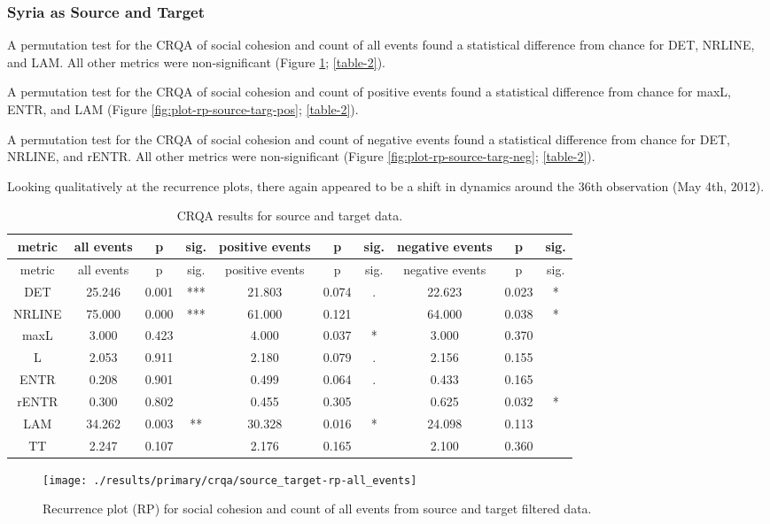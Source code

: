 \documentclass[
  english,
  man]{apa6}
\begin{document}
\hypertarget{syria-as-source-and-target}{%
\subsubsection{Syria as Source and Target}\label{syria-as-source-and-target}}

A permutation test for the CRQA of social cohesion and count of all events found
a statistical difference from chance for DET, NRLINE, and LAM. All other metrics
were non-significant (Figure \ref{fig:plot-rp-source-targ-all};
\autoref{table-2}).

A permutation test for the CRQA of social cohesion and count of positive events
found a statistical difference from chance for maxL, ENTR, and LAM (Figure
\ref{fig:plot-rp-source-targ-pos}; \autoref{table-2}).

A permutation test for the CRQA of social cohesion and count of negative events
found a statistical difference from chance for DET, NRLINE, and rENTR. All other
metrics were non-significant (Figure \ref{fig:plot-rp-source-targ-neg};
\autoref{table-2}).

Looking qualitatively at the recurrence plots, there again appeared to be a
shift in dynamics around the 36th observation (May 4th, 2012).

\begin{longtable}[]{@{}cccccccccc@{}}
\caption{\label{table-2}CRQA results for source and target data.}\tabularnewline
\toprule
metric & all events & p & sig. & positive events & p & sig. & negative events & p & sig.\tabularnewline
\midrule
\endfirsthead
\toprule
metric & all events & p & sig. & positive events & p & sig. & negative events & p & sig.\tabularnewline
\midrule
\endhead
DET & 25.246 & 0.001 & *** & 21.803 & 0.074 & . & 22.623 & 0.023 & *\tabularnewline
NRLINE & 75.000 & 0.000 & *** & 61.000 & 0.121 & & 64.000 & 0.038 & *\tabularnewline
maxL & 3.000 & 0.423 & & 4.000 & 0.037 & * & 3.000 & 0.370 &\tabularnewline
L & 2.053 & 0.911 & & 2.180 & 0.079 & . & 2.156 & 0.155 &\tabularnewline
ENTR & 0.208 & 0.901 & & 0.499 & 0.064 & . & 0.433 & 0.165 &\tabularnewline
rENTR & 0.300 & 0.802 & & 0.455 & 0.305 & & 0.625 & 0.032 & *\tabularnewline
LAM & 34.262 & 0.003 & ** & 30.328 & 0.016 & * & 24.098 & 0.113 &\tabularnewline
TT & 2.247 & 0.107 & & 2.176 & 0.165 & & 2.100 & 0.360 &\tabularnewline
\bottomrule
\end{longtable}

\begin{figure}
\texttt{[image: ./results/primary/crqa/source\_target-rp-all\_events]} \caption{Recurrence plot (RP) for social cohesion and count of all events from source and target filtered data.}\label{fig:plot-rp-source-targ-all}
\end{figure}
\end{document}
